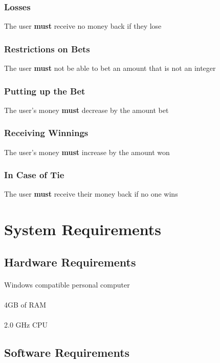 \documentclass{article}
\begin{document}
\subsubsection{Losses}The user \textbf{must} receive no money back if they lose
\subsubsection{Restrictions on Bets}The user \textbf{must} not be able to bet an amount that is not an integer
\subsubsection{Putting up the Bet}The user’s money \textbf{must} decrease by the amount bet
\subsubsection{Receiving Winnings}The user’s money \textbf{must} increase by the amount won
\subsubsection{In Case of Tie}The user \textbf{must} receive their money back if no one wins

\section{System Requirements}


\subsection{Hardware Requirements}

\paragraph{} Windows compatible personal computer
\paragraph{} 4GB of RAM
\paragraph{} 2.0 GHz CPU

\subsection{Software Requirements}
\end{document}
